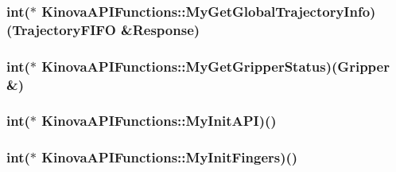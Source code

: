 \subsubsection[{\texorpdfstring{My\+Get\+Global\+Trajectory\+Info}{MyGetGlobalTrajectoryInfo}}]{\setlength{\rightskip}{0pt plus 5cm}int($\ast$ Kinova\+A\+P\+I\+Functions\+::\+My\+Get\+Global\+Trajectory\+Info)(Trajectory\+F\+I\+FO \&Response)}\hypertarget{classKinovaAPIFunctions_abbedf0c8f15beab985ac2084ba84715b}{}\label{classKinovaAPIFunctions_abbedf0c8f15beab985ac2084ba84715b}
\subsubsection[{\texorpdfstring{My\+Get\+Gripper\+Status}{MyGetGripperStatus}}]{\setlength{\rightskip}{0pt plus 5cm}int($\ast$ Kinova\+A\+P\+I\+Functions\+::\+My\+Get\+Gripper\+Status)(Gripper \&)}\hypertarget{classKinovaAPIFunctions_accc1c9c658d15e8601457b5fcd4af5b2}{}\label{classKinovaAPIFunctions_accc1c9c658d15e8601457b5fcd4af5b2}
\subsubsection[{\texorpdfstring{My\+Init\+A\+PI}{MyInitAPI}}]{\setlength{\rightskip}{0pt plus 5cm}int($\ast$ Kinova\+A\+P\+I\+Functions\+::\+My\+Init\+A\+PI)()}\hypertarget{classKinovaAPIFunctions_a32397f27720f138bdc10773d33ef9da6}{}\label{classKinovaAPIFunctions_a32397f27720f138bdc10773d33ef9da6}
\subsubsection[{\texorpdfstring{My\+Init\+Fingers}{MyInitFingers}}]{\setlength{\rightskip}{0pt plus 5cm}int($\ast$ Kinova\+A\+P\+I\+Functions\+::\+My\+Init\+Fingers)()}\hypertarget{classKinovaAPIFunctions_a98b6741e75ab4b262a9bd630fdb9f562}{}\label{classKinovaAPIFunctions_a98b6741e75ab4b262a9bd630fdb9f562}
